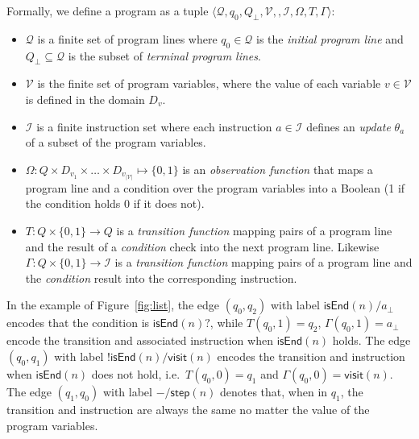 \documentclass[10pt,a4paper]{paper}
\newcommand{\tup}[1]{{\langle #1 \rangle}}
\begin{document}
Formally, we define a program as a tuple $\tup{\mathcal{Q},q_0,Q_\bot,\mathcal{V},,\mathcal{I},\Omega,T,\Gamma}$:
\begin{itemize}
\item $\mathcal{Q}$ is a finite set of program lines where $q_0\in \mathcal{Q}$ is the {\em initial program line} and $Q_\bot\subseteq \mathcal{Q}$ is the subset of {\em terminal program lines}.
\item $\mathcal{V}$ is the finite set of program variables, where the value of each variable $v\in\mathcal{V}$ is defined in the domain $D_v$.
\item $\mathcal{I}$ is a finite instruction set where each instruction $a\in \mathcal{I}$ defines an {\em update} $\theta_a$ of a subset of the program variables.
\item $\Omega:Q\times D_{v_1}\times \ldots \times D_{v_{|\mathcal{V}|}}\mapsto\{0,1\}$ is an {\em observation function} that maps a program line and a condition over the program variables into a Boolean (1 if the condition holds 0 if  it does not). 
\item $T:Q\times\{0,1\}\rightarrow Q$ is a {\em transition function} mapping pairs of a program line and the result of a {\em condition} check into the next program line. Likewise $\Gamma:Q\times\{0,1\}\rightarrow \mathcal{I}$ is a {\em transition function} mapping pairs of a program line and the {\em condition} result into the corresponding instruction.
\end{itemize}

In the example of Figure~\ref{fig:list}, the edge $(q_0,q_2)$ with label $\mathsf{isEnd}(n)/a_\bot$ encodes that the condition is $\mathsf{isEnd}(n)?$, while $T(q_0,1)=q_2$, $\Gamma(q_0,1)=a_\bot$ encode the transition and associated instruction when $\mathsf{isEnd}(n)$ holds. The edge $(q_0,q_1)$ with label $!\mathsf{isEnd}(n)/\mathsf{visit}(n)$ encodes the transition and instruction when $\mathsf{isEnd}(n)$ does not hold, i.e.~$T(q_0,0)=q_1$ and $\Gamma(q_0,0)=\mathsf{visit}(n)$. The edge $(q_1,q_0)$ with label $-/\mathsf{step}(n)$ denotes that, when in $q_1$, the transition and instruction are always the same no matter the value of the program variables.
\end{document}

